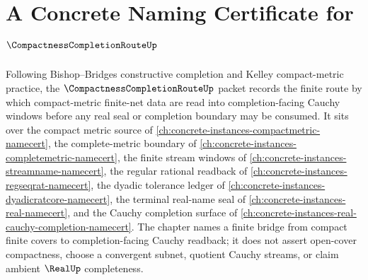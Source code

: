 \chapter{A Concrete Naming Certificate for $\CompactnessCompletionRouteUp$}
\label{ch:concrete-instances-compactness-completion-route-namecert}

Following Bishop--Bridges constructive completion and Kelley compact-metric practice, the $\CompactnessCompletionRouteUp$ packet records the finite route by which compact-metric finite-net data are read into completion-facing Cauchy windows before any real seal or completion boundary may be consumed. It sits over the compact metric source of \autoref{ch:concrete-instances-compactmetric-namecert}, the complete-metric boundary of \autoref{ch:concrete-instances-completemetric-namecert}, the finite stream windows of \autoref{ch:concrete-instances-streamname-namecert}, the regular rational readback of \autoref{ch:concrete-instances-regseqrat-namecert}, the dyadic tolerance ledger of \autoref{ch:concrete-instances-dyadicratcore-namecert}, the terminal real-name seal of \autoref{ch:concrete-instances-real-namecert}, and the Cauchy completion surface of \autoref{ch:concrete-instances-real-cauchy-completion-namecert}. The chapter names a finite bridge from compact finite covers to completion-facing Cauchy readback; it does not assert open-cover compactness, choose a convergent subnet, quotient Cauchy streams, or claim ambient $\RealUp$ completeness.

